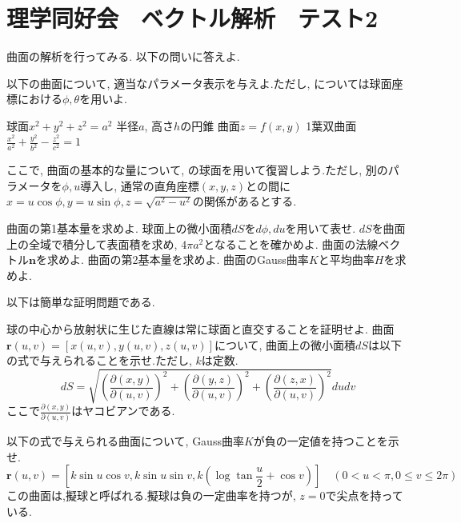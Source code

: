 \documentclass[a4j,dvipdfmx]{jsarticle}
\begin{document}
    \part*{理学同好会　ベクトル解析　テスト2}
        曲面の解析を行ってみる. 以下の問いに答えよ.
        \begin{qparts}
            \qpart 以下の曲面について, 適当なパラメータ表示を与えよ.ただし, については球面座標における$\phi,\theta$を用いよ.
            \begin{qlist}
                \qitem 球面$x^2+y^2+z^2=a^2$ \label{q:球面のパラメータの問}
                \qitem 半径$a$, 高さ$h$の円錐
                \qitem 曲面$z=f(x,y)$
                \qitem 1葉双曲面$\displaystyle \frac{x^2}{a^2}+\frac{y^2}{b^2}-\frac{z^2}{c^2}=1$
            \end{qlist}
            \qpart ここで, 曲面の基本的な量について, の球面を用いて復習しよう.ただし, 別のパラメータを$\phi,u$導入し, 通常の直角座標$(x,y,z)$との間に
            $x=u\cos\phi,y=u\sin\phi,z=\sqrt{a^2-u^2}$の関係があるとする.
            \begin{qlist}
                \qitem 曲面の第1基本量を求めよ.
                \qitem 球面上の微小面積$dS$を$d\phi,du$を用いて表せ.
                \qitem $dS$を曲面上の全域で積分して表面積を求め, $4\pi a^2$となることを確かめよ.
                \qitem 曲面の法線ベクトル$\bm{n}$を求めよ.
                \qitem 曲面の第2基本量を求めよ.
                \qitem 曲面のGauss曲率$K$と平均曲率$H$を求めよ.
            \end{qlist}
            \qpart 以下は簡単な証明問題である.
            \begin{qlist}
                \qitem 球の中心から放射状に生じた直線は常に球面と直交することを証明せよ.
                \qitem 曲面$\bm{r}(u,v)=[x(u,v),y(u,v),z(u,v)]$について, 曲面上の微小面積$dS$は以下の式で与えられることを示せ.ただし, $k$は定数.
                \begin{equation}
                    dS = \sqrt{\left(\frac{\partial(x,y)}{\partial(u,v)}\right)^2+\left(\frac{\partial(y,z)}{\partial(u,v)}\right)^2+\left(\frac{\partial(z,x)}{\partial(u,v)}\right)^2}dudv
                \end{equation}
                ここで$\displaystyle \frac{\partial(x,y)}{\partial(u,v)}$はヤコビアンである.
            \end{qlist}
            \qpart 以下の式で与えられる曲面について, Gauss曲率$K$が負の一定値を持つことを示せ.
                \begin{equation}
                    \bm{r}(u,v)=\left[k\sin u\cos v, k\sin u\sin v,k\left(\log\tan\frac{u}{2}+\cos v\right)\right]\quad (0<u<\pi,0\leq v\leq 2\pi)
                \end{equation}
                この曲面は,擬球と呼ばれる.擬球は負の一定曲率を持つが, $z=0$で尖点を持っている. 
        \end{qparts}
    \clearpage
\end{document}
